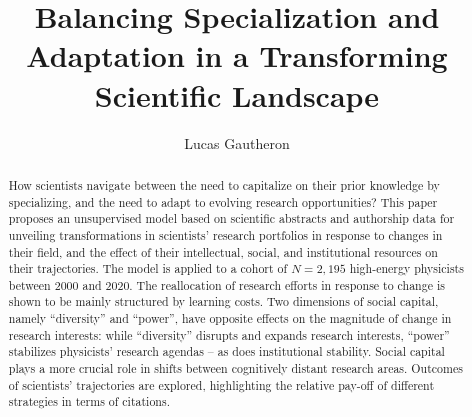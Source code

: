 \documentclass{article}
\title{Balancing Specialization and Adaptation in a Transforming Scientific Landscape}
\author{Lucas Gautheron}
\date{}
\begin{document}
\maketitle

\begin{abstract}
    How scientists navigate between the need to capitalize on their prior knowledge by specializing, and the need to adapt to evolving research opportunities? This paper proposes an unsupervised model based on scientific abstracts and authorship data for unveiling transformations in scientists' research portfolios in response to changes in their field, and the effect of their intellectual, social, and institutional resources on their trajectories. The model is applied to a cohort of $N=2,195$ high-energy physicists between 2000 and 2020. %
    The reallocation of research efforts in response to change is shown to be mainly structured by learning costs. Two dimensions of social capital, namely ``diversity'' and ``power'', have opposite effects on the magnitude of change in research interests: while ``diversity'' disrupts and expands research interests, ``power'' stabilizes physicists' research agendas -- as does institutional stability. Social capital plays a more crucial role in shifts between cognitively distant research areas. Outcomes of scientists' trajectories are explored, highlighting the relative pay-off of different strategies in terms of citations.
\end{abstract}





\end{document}
